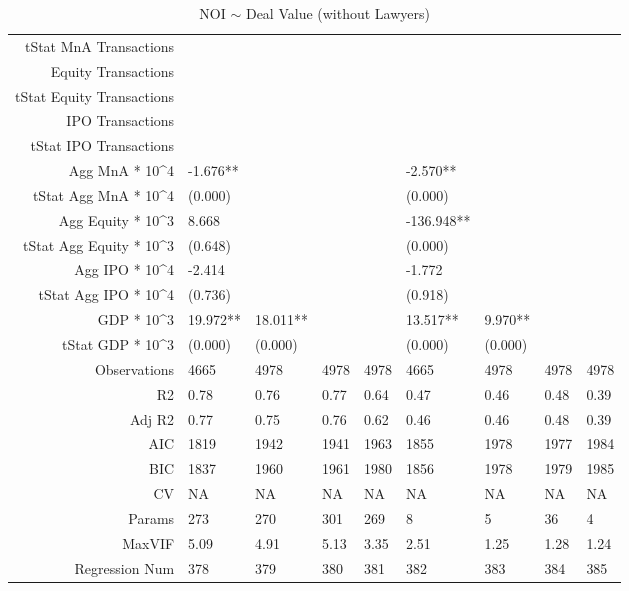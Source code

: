 \begin{table}[ht]
\begin{tabular}{rllllllll}
  tStat MnA Transactions &  &  &  &  &  &  &  &  \\ 
  Equity Transactions &  &  &  &  &  &  &  &  \\ 
  tStat Equity Transactions &  &  &  &  &  &  &  &  \\ 
  IPO Transactions &  &  &  &  &  &  &  &  \\ 
  tStat IPO Transactions &  &  &  &  &  &  &  &  \\ 
  Agg MnA * 10^4 & -1.676** &  &  &  & -2.570** &  &  &  \\ 
  tStat Agg MnA * 10^4 & (0.000) &  &  &  & (0.000) &  &  &  \\ 
  Agg Equity * 10^3 & 8.668 &  &  &  & -136.948** &  &  &  \\ 
  tStat Agg Equity * 10^3 & (0.648) &  &  &  & (0.000) &  &  &  \\ 
  Agg IPO * 10^4 & -2.414 &  &  &  & -1.772 &  &  &  \\ 
  tStat Agg IPO * 10^4 & (0.736) &  &  &  & (0.918) &  &  &  \\ 
  GDP * 10^3 & 19.972** & 18.011** &  &  & 13.517** & 9.970** &  &  \\ 
  tStat GDP * 10^3 & (0.000) & (0.000) &  &  & (0.000) & (0.000) &  &  \\ 
  Observations & 4665 & 4978 & 4978 & 4978 & 4665 & 4978 & 4978 & 4978 \\ 
  R2 & 0.78 & 0.76 & 0.77 & 0.64 & 0.47 & 0.46 & 0.48 & 0.39 \\ 
  Adj R2 & 0.77 & 0.75 & 0.76 & 0.62 & 0.46 & 0.46 & 0.48 & 0.39 \\ 
  AIC & 1819 & 1942 & 1941 & 1963 & 1855 & 1978 & 1977 & 1984 \\ 
  BIC & 1837 & 1960 & 1961 & 1980 & 1856 & 1978 & 1979 & 1985 \\ 
  CV & NA & NA & NA & NA & NA & NA & NA & NA \\ 
  Params & 273 & 270 & 301 & 269 & 8 & 5 & 36 & 4 \\ 
  MaxVIF & 5.09 & 4.91 & 5.13 & 3.35 & 2.51 & 1.25 & 1.28 & 1.24 \\ 
  Regression Num & 378 & 379 & 380 & 381 & 382 & 383 & 384 & 385 \\ 
   \hline
\end{tabular}
\caption{NOI $\sim$ Deal Value (without Lawyers)} 
\end{table}
